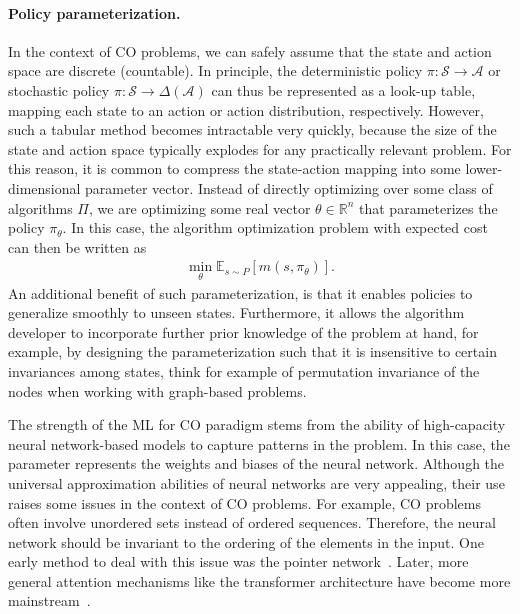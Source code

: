\documentclass[a4paper]{report}
\theoremstyle{definition}
\theoremstyle{plain}
\begin{document}
\paragraph{Policy parameterization.}

In the context of CO problems, we can safely assume that the state and action
space are discrete (countable).
%
In principle, the deterministic policy
$\pi : \mathcal{S} \rightarrow \mathcal{A}$ or stochastic policy
$\pi : \mathcal{S} \rightarrow \Delta(\mathcal{A})$ can thus be represented as a
look-up table, mapping each state to an action or action distribution,
respectively.
%
However, such a tabular method becomes intractable very quickly, because the
size of the state and action space typically explodes for any practically
relevant problem.
For this reason, it is common to compress the state-action mapping into some
lower-dimensional parameter vector.
%
Instead of directly optimizing over some class of algorithms $\Pi$, we are
optimizing some real vector $\theta \in \mathbb{R}^n$ that parameterizes the
policy $\pi_\theta$. In this case, the algorithm optimization problem with
expected cost can then be written as
\begin{align}
  \label{eq:4}
  \min_\theta \mathbb{E}_{s \sim P}[m(s, \pi_\theta)] .
\end{align}
%
An additional benefit of such parameterization, is that it enables policies to
generalize smoothly to unseen states.
Furthermore, it allows the algorithm developer to incorporate further prior
knowledge of the problem at hand, for example, by designing the parameterization
such that it is insensitive to certain invariances among states, think for
example of permutation invariance of the nodes when working with graph-based
problems.

The strength of the ML for CO paradigm stems from the ability of high-capacity
neural network-based models to capture patterns in the problem.
%
In this case, the parameter represents the weights and biases of the neural
network.
Although the universal approximation abilities of neural networks are very
appealing, their use raises some issues in the context of CO problems. For
example, CO problems often involve unordered sets instead of ordered sequences.
Therefore, the neural network should be invariant to the ordering of the
elements in the input. One early method to deal with this issue was the pointer
network~\cite{vinyalsPointerNetworks2017a}.
Later, more general attention mechanisms like the transformer architecture have
become more mainstream~\cite{koolAttentionLearnSolve2019}.
\end{document}
